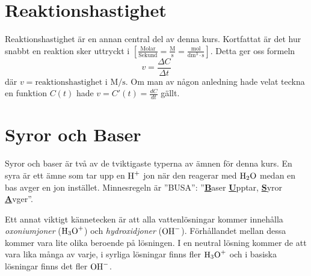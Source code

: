\documentclass[12pt]{article}
\theoremstyle{definition}
\begin{document}
    
    \setcounter{exm}{0}
    
    
    \setcounter{exm}{0}

    \part{Reaktionshastighet}
    Reaktionshastighet är en annan central del av denna kurs. Kortfattat är det hur snabbt en reaktion sker uttryckt i $\mathrm{\left[\frac{Molar}{Sekund} = \frac{M}{s} = \frac{mol}{dm^3 \cdot s}\right]}$. Detta ger oss formeln 
    \begin{equation*}
        v = \frac{\Delta C}{\Delta t} 
    \end{equation*}
    där $v = \text{reaktionshastighet i } \mathrm{M/s}$. Om man av någon anledning hade velat teckna en funktion $C(t)$ hade $v = C'(t) = \frac{dC}{dt}$ gällt.

    
    \setcounter{exm}{0}

    \part{Syror och Baser}
    Syror och baser är två av de tviktigaste typerna av ämnen för denna kurs. En syra är ett ämne som tar upp en $\ce{H+}$ jon när den reagerar med $\ce{H2O}$ medan en bas avger en jon instället. Minnesregeln är ''BUSA'': ''\underline{\textbf{B}}aser \underline{\textbf{U}}pptar, \underline{\textbf{S}}yror \underline{\textbf{A}}vger''.

    Ett annat viktigt kännetecken är att alla vattenlösningar kommer innehålla \emph{oxoniumjoner} ($\ce{H3O+}$) och \emph{hydroxidjoner} ($\ce{OH-}$). Förhållandet mellan dessa kommer vara lite olika beroende på lösningen. I en neutral lösning kommer de att vara lika många av varje, i syrliga lösningar finns fler $\ce{H3O+}$ och i basiska lösningar finns det fler $\ce{OH-}$.

    
\end{document}
